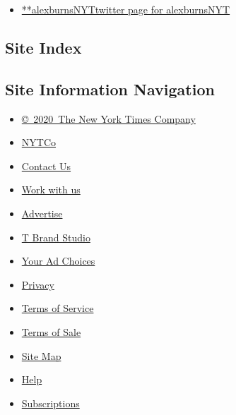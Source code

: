 \begin{itemize}
\tightlist
\item
  \href{https://twitter.com/alexburnsNYT}{**alexburnsNYTtwitter page for
  alexburnsNYT}
\end{itemize}

\hypertarget{site-index}{%
\subsection{Site Index}\label{site-index}}

\hypertarget{site-information-navigation}{%
\subsection{Site Information
Navigation}\label{site-information-navigation}}

\begin{itemize}
\tightlist
\item
  \href{https://help.nytimes3xbfgragh.onion/hc/en-us/articles/115014792127-Copyright-notice}{©~2020~The
  New York Times Company}
\end{itemize}

\begin{itemize}
\tightlist
\item
  \href{https://www.nytco.com/}{NYTCo}
\item
  \href{https://help.nytimes3xbfgragh.onion/hc/en-us/articles/115015385887-Contact-Us}{Contact
  Us}
\item
  \href{https://www.nytco.com/careers/}{Work with us}
\item
  \href{https://nytmediakit.com/}{Advertise}
\item
  \href{http://www.tbrandstudio.com/}{T Brand Studio}
\item
  \href{https://www.nytimes3xbfgragh.onion/privacy/cookie-policy\#how-do-i-manage-trackers}{Your
  Ad Choices}
\item
  \href{https://www.nytimes3xbfgragh.onion/privacy}{Privacy}
\item
  \href{https://help.nytimes3xbfgragh.onion/hc/en-us/articles/115014893428-Terms-of-service}{Terms
  of Service}
\item
  \href{https://help.nytimes3xbfgragh.onion/hc/en-us/articles/115014893968-Terms-of-sale}{Terms
  of Sale}
\item
  \href{https://spiderbites.nytimes3xbfgragh.onion}{Site Map}
\item
  \href{https://help.nytimes3xbfgragh.onion/hc/en-us}{Help}
\item
  \href{https://www.nytimes3xbfgragh.onion/subscription?campaignId=37WXW}{Subscriptions}
\end{itemize}
